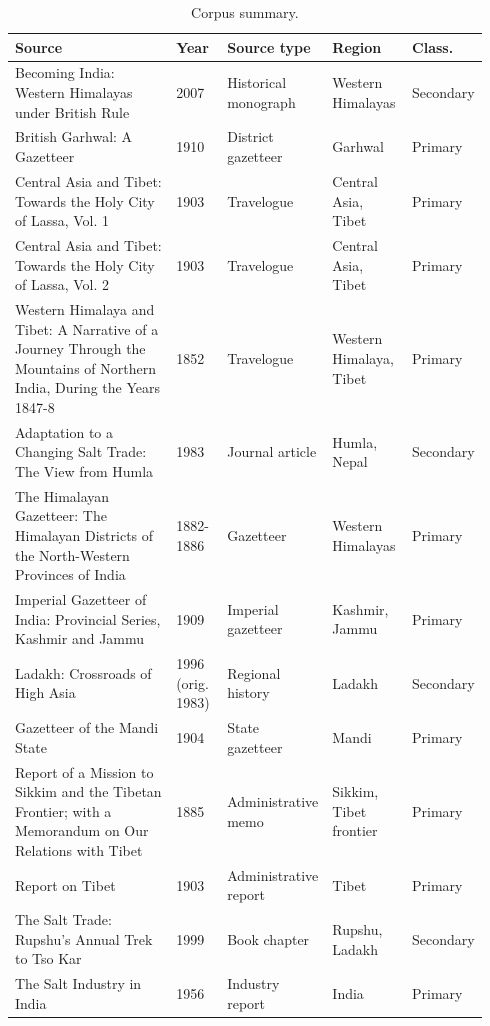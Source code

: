 
\begin{table}[htbp]
\centering
\caption{Corpus summary.}
\label{tab:corpus-summary}
\scriptsize
\begin{tabular}{p{0.38\linewidth}p{0.11\linewidth}p{0.18\linewidth}p{0.17\linewidth}p{0.10\linewidth}}
\hline
Source & Year & Source type & Region & Class. \\
\hline
Becoming India: Western Himalayas under British Rule & 2007 & Historical monograph & Western Himalayas & Secondary \\
British Garhwal: A Gazetteer & 1910 & District gazetteer & Garhwal & Primary \\
Central Asia and Tibet: Towards the Holy City of Lassa, Vol. 1 & 1903 & Travelogue & Central Asia, Tibet & Primary \\
Central Asia and Tibet: Towards the Holy City of Lassa, Vol. 2 & 1903 & Travelogue & Central Asia, Tibet & Primary \\
Western Himalaya and Tibet: A Narrative of a Journey Through the Mountains of Northern India, During the Years 1847-8 & 1852 & Travelogue & Western Himalaya, Tibet & Primary \\
Adaptation to a Changing Salt Trade: The View from Humla & 1983 & Journal article & Humla, Nepal & Secondary \\
The Himalayan Gazetteer: The Himalayan Districts of the North-Western Provinces of India & 1882-1886 & Gazetteer & Western Himalayas & Primary \\
Imperial Gazetteer of India: Provincial Series, Kashmir and Jammu & 1909 & Imperial gazetteer & Kashmir, Jammu & Primary \\
Ladakh: Crossroads of High Asia & 1996 (orig. 1983) & Regional history & Ladakh & Secondary \\
Gazetteer of the Mandi State & 1904 & State gazetteer & Mandi & Primary \\
Report of a Mission to Sikkim and the Tibetan Frontier; with a Memorandum on Our Relations with Tibet & 1885 & Administrative memo & Sikkim, Tibet frontier & Primary \\
Report on Tibet & 1903 & Administrative report & Tibet & Primary \\
The Salt Trade: Rupshu's Annual Trek to Tso Kar & 1999 & Book chapter & Rupshu, Ladakh & Secondary \\
The Salt Industry in India & 1956 & Industry report & India & Primary \\

\end{tabular}
\end{table}
